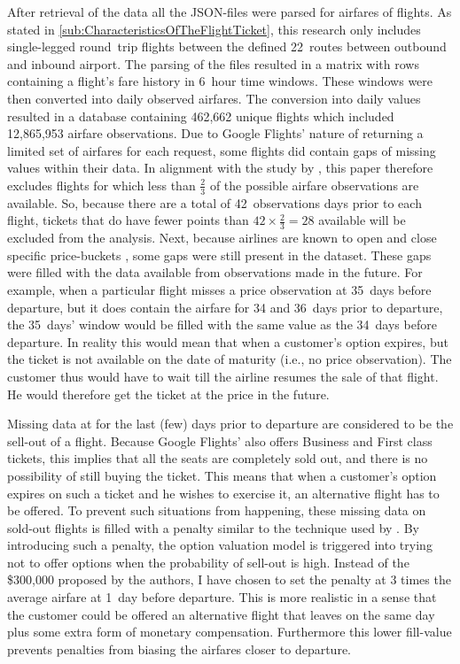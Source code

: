 After retrieval of the data all the JSON-files were parsed for airfares of flights. As stated in \autoref{sub:CharacteristicsOfTheFlightTicket}, this research only includes single-legged round~trip flights between the defined 22~routes between outbound and inbound airport. The parsing of the files resulted in a matrix with rows containing a flight's fare history in 6~hour time windows. These windows were then converted into daily observed airfares. The conversion into daily values resulted in a database containing 462,662 unique flights which included 12,865,953 airfare observations. Due to Google Flights' nature of returning a limited set of airfares for each request, some flights did contain gaps of missing values within their data. In alignment with the study by , this paper therefore excludes flights for which less than $\frac{2}{3}$ of the possible airfare observations are available. So, because there are a total of 42~observations days prior to each flight, tickets that do have fewer points than $42 \times \frac{2}{3} = 28$ available will be excluded from the analysis. Next, because airlines are known to open and close specific price-buckets \cite{mcgill1999revenue}, some gaps were still present in the dataset. These gaps were filled with the data available from observations made in the future. For example, when a particular flight misses a price observation at 35~days before departure, but it does contain the airfare for 34 and 36~days prior to departure, the 35~days' window would be filled with the same value as the 34~days before departure. In reality this would mean that when a customer's option expires, but the ticket is not available on the date of maturity (i.e., no price observation). The customer thus would have to wait till the airline resumes the sale of that flight. He would therefore get the ticket at the price in the future.

Missing data at for the last (few) days prior to departure are considered to be the sell-out of a flight. Because Google Flights' also offers Business and First class tickets, this implies that all the seats are completely sold out, and there is no possibility of still buying the ticket. This means that when a customer's option expires on such a ticket and he wishes to exercise it, an alternative flight has to be offered. To prevent such situations from happening, these missing data on sold-out flights is filled with a penalty similar to the technique used by . By introducing such a penalty, the option valuation model is triggered into trying not to offer options when the probability of sell-out is high. Instead of the \$300,000 proposed by the authors, I have chosen to set the penalty at 3 times the average airfare at 1~day before departure. This is more realistic in a sense that the customer could be offered an alternative flight that leaves on the same day plus some extra form of monetary compensation. Furthermore this lower fill-value prevents penalties from biasing the airfares closer to departure.

